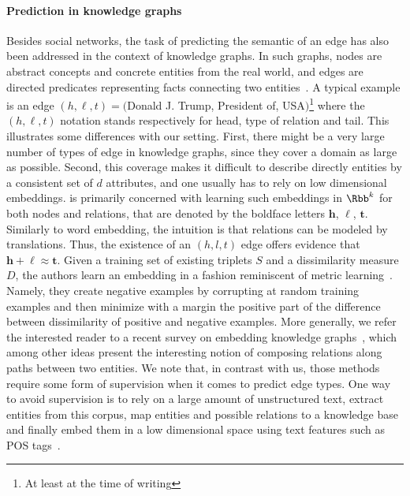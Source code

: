 \paragraph{Prediction in knowledge graphs}
\label{par:erw_pred_kg}

Besides social networks, the task of predicting the semantic of an edge has also been addressed in
the context of knowledge graphs. In such graphs, nodes are abstract concepts and concrete entities
from the real world, and edges are directed predicates representing facts connecting two
entities~\autocite{KnowledgeGraphSurvey16}. A typical example is an edge $(h, \ell, t) =
($\textsf{Donald J. Trump}, \textsf{President of}, \textsf{USA}$)$\footnote{At least at the time of
writing} where the $(h, \ell, t)$ notation stands respectively for head, type of relation and tail.
This illustrates some differences with our setting. First, there might be a very large number of
types of edge in knowledge graphs, since they cover a domain as large as possible. Second, this
coverage makes it difficult to describe directly entities by a consistent set of $d$ attributes, and
one usually has to rely on low dimensional embeddings. \autocite{transE13} is primarily concerned
with learning such embeddings in $\Rbb^k$ for both nodes and relations, that are denoted by the
boldface letters $\bm{h}$, $\bm{\ell}$, $\bm{t}$. Similarly to word embedding, the intuition is that
relations can be modeled by translations. Thus, the existence of an $(h,l,t)$ edge offers evidence that
$\bm{h} + \bm{\ell} \approx \bm{t}$. Given a training set of existing triplets $S$ and a
dissimilarity measure $D$, the authors learn an embedding in a fashion reminiscent of metric
learning~\autocite{MetricLearning15}. Namely, they create negative examples by corrupting at random
training examples and then minimize with a margin the positive part of the difference between
dissimilarity of positive and negative examples. More generally, we refer the interested reader to a
recent survey on embedding knowledge graphs~\autocite{KnowledgeGraphSurvey17}, which among other
ideas present the interesting notion of composing relations along paths between two entities. We note
that, in contrast with us, those methods require some form of supervision when it comes to predict
edge types.  One way to avoid supervision is to rely on a large amount of unstructured text, extract
entities from this corpus, map entities and possible relations to a knowledge base and finally embed
them in a low dimensional space using text features such as POS tags~\autocite{Ren2017}.

